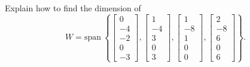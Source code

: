 \documentclass{article}
\begin{document}

\begin{exerciseStatement}
    Explain how to find the dimension of
\[W=\mathrm{span}\ \left\{\left[\begin{array}{r}
0 \\
-4 \\
-2 \\
0 \\
-3
\end{array}\right] , \left[\begin{array}{r}
1 \\
-4 \\
3 \\
0 \\
3
\end{array}\right] , \left[\begin{array}{r}
1 \\
-8 \\
1 \\
0 \\
0
\end{array}\right] , \left[\begin{array}{r}
2 \\
-8 \\
6 \\
0 \\
6
\end{array}\right]\right\}.\]



  
\end{exerciseStatement}
\end{document}

